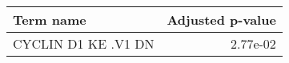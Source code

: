 \begin{tabular}{lr}
\toprule
          Term name &  Adjusted p-value \\
\midrule
CYCLIN D1 KE .V1 DN &          2.77e-02 \\
\bottomrule
\end{tabular}
